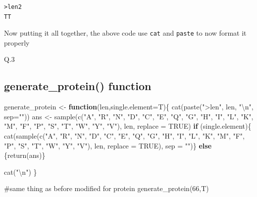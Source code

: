 \documentclass[
  letterpaper,
  DIV=11,
  numbers=noendperiod]{scrartcl}
\newenvironment{Shaded}{\begin{snugshade}}{\end{snugshade}}
\newcommand{\AttributeTok}[1]{\textcolor[rgb]{0.40,0.45,0.13}{#1}}
\newcommand{\CommentTok}[1]{\textcolor[rgb]{0.37,0.37,0.37}{#1}}
\newcommand{\ConstantTok}[1]{\textcolor[rgb]{0.56,0.35,0.01}{#1}}
\newcommand{\ControlFlowTok}[1]{\textcolor[rgb]{0.00,0.23,0.31}{\textbf{#1}}}
\newcommand{\DecValTok}[1]{\textcolor[rgb]{0.68,0.00,0.00}{#1}}
\newcommand{\FunctionTok}[1]{\textcolor[rgb]{0.28,0.35,0.67}{#1}}
\newcommand{\NormalTok}[1]{\textcolor[rgb]{0.00,0.23,0.31}{#1}}
\newcommand{\OtherTok}[1]{\textcolor[rgb]{0.00,0.23,0.31}{#1}}
\newcommand{\SpecialCharTok}[1]{\textcolor[rgb]{0.37,0.37,0.37}{#1}}
\newcommand{\StringTok}[1]{\textcolor[rgb]{0.13,0.47,0.30}{#1}}
\begin{document}
\begin{verbatim}
>len2
TT
\end{verbatim}

Now putting it all together, the above code use \texttt{cat} and
\texttt{paste} to now format it properly

Q.3

\subsection{generate\_protein()
function}\label{generate_protein-function}

\begin{Shaded}
\begin{Highlighting}[]
\NormalTok{generate\_protein }\OtherTok{\textless{}{-}} \ControlFlowTok{function}\NormalTok{(len,}\AttributeTok{single.element=}\NormalTok{T)\{}
\FunctionTok{cat}\NormalTok{(}\FunctionTok{paste}\NormalTok{(}\StringTok{"\textgreater{}len"}\NormalTok{, len, }\StringTok{"}\SpecialCharTok{\textbackslash{}n}\StringTok{"}\NormalTok{, }\AttributeTok{sep=}\StringTok{""}\NormalTok{))}
\NormalTok{ans }\OtherTok{\textless{}{-}} \FunctionTok{sample}\NormalTok{(}\FunctionTok{c}\NormalTok{(}\StringTok{"A"}\NormalTok{, }\StringTok{"R"}\NormalTok{, }\StringTok{"N"}\NormalTok{, }\StringTok{"D"}\NormalTok{, }\StringTok{"C"}\NormalTok{, }\StringTok{"E"}\NormalTok{, }\StringTok{"Q"}\NormalTok{, }\StringTok{"G"}\NormalTok{, }\StringTok{"H"}\NormalTok{, }\StringTok{"I"}\NormalTok{, }\StringTok{"L"}\NormalTok{, }\StringTok{"K"}\NormalTok{, }\StringTok{"M"}\NormalTok{, }\StringTok{"F"}\NormalTok{, }\StringTok{"P"}\NormalTok{, }\StringTok{"S"}\NormalTok{,}
\StringTok{"T"}\NormalTok{, }\StringTok{"W"}\NormalTok{, }\StringTok{"Y"}\NormalTok{, }\StringTok{"V"}\NormalTok{), len, }\AttributeTok{replace =} \ConstantTok{TRUE}\NormalTok{)}
    \ControlFlowTok{if}\NormalTok{ (single.element)\{}
     \FunctionTok{cat}\NormalTok{(}\FunctionTok{sample}\NormalTok{(}\FunctionTok{c}\NormalTok{(}\StringTok{"A"}\NormalTok{, }\StringTok{"R"}\NormalTok{, }\StringTok{"N"}\NormalTok{, }\StringTok{"D"}\NormalTok{, }\StringTok{"C"}\NormalTok{, }\StringTok{"E"}\NormalTok{, }\StringTok{"Q"}\NormalTok{, }\StringTok{"G"}\NormalTok{, }\StringTok{"H"}\NormalTok{, }\StringTok{"I"}\NormalTok{, }\StringTok{"L"}\NormalTok{, }\StringTok{"K"}\NormalTok{, }\StringTok{"M"}\NormalTok{, }\StringTok{"F"}\NormalTok{, }\StringTok{"P"}\NormalTok{, }\StringTok{"S"}\NormalTok{,}
\StringTok{"T"}\NormalTok{, }\StringTok{"W"}\NormalTok{, }\StringTok{"Y"}\NormalTok{, }\StringTok{"V"}\NormalTok{), len, }\AttributeTok{replace =} \ConstantTok{TRUE}\NormalTok{), }\AttributeTok{sep =} \StringTok{""}\NormalTok{)\}}
\ControlFlowTok{else}\NormalTok{ \{}\FunctionTok{return}\NormalTok{(ans)\}}

\FunctionTok{cat}\NormalTok{(}\StringTok{"}\SpecialCharTok{\textbackslash{}n}\StringTok{"}\NormalTok{)}
\NormalTok{\}}

\CommentTok{\#same thing as before modified for protein}
\FunctionTok{generate\_protein}\NormalTok{(}\DecValTok{66}\NormalTok{,T)}
\end{Highlighting}
\end{Shaded}
\end{document}
